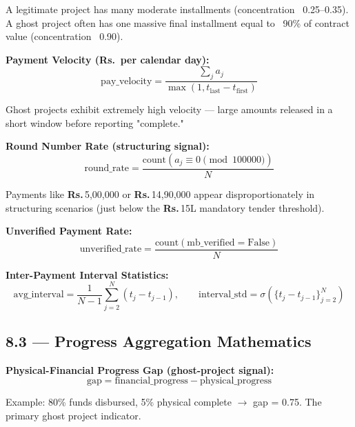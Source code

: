 \documentclass[11pt,a4paper]{article}
\DeclareRobustCommand{\INR}{\textbf{Rs.\,}}
\DeclareRobustCommand{\INR}{₹}
\begin{document}
\begin{tcolorbox}[colback=blue!4!white,colframe=blue!60!black,arc=1.5mm,boxrule=0.7pt,left=8pt,right=8pt,top=6pt,bottom=6pt]
A legitimate project has many moderate installments (concentration ~0.25–0.35). A ghost project often has one massive final installment equal to ~90\% of contract value (concentration ~0.90).\\
\end{tcolorbox}

\textbf{Payment Velocity (\INR{} per calendar day):}
\[ \text{pay\_velocity} = \frac{\sum_j a_j}{\max(1, t_\text{last} - t_\text{first})} \]

\begin{tcolorbox}[colback=blue!4!white,colframe=blue!60!black,arc=1.5mm,boxrule=0.7pt,left=8pt,right=8pt,top=6pt,bottom=6pt]
Ghost projects exhibit extremely high velocity --- large amounts released in a short window before reporting "complete."\\
\end{tcolorbox}

\textbf{Round Number Rate (structuring signal):}
\[ \text{round\_rate} = \frac{\text{count}(a_j \equiv 0 \pmod{100000})}{N} \]

\begin{tcolorbox}[colback=blue!4!white,colframe=blue!60!black,arc=1.5mm,boxrule=0.7pt,left=8pt,right=8pt,top=6pt,bottom=6pt]
Payments like \INR{}5,00,000 or \INR{}14,90,000 appear disproportionately in structuring scenarios (just below the \INR{}15L mandatory tender threshold).\\
\end{tcolorbox}

\textbf{Unverified Payment Rate:}
\[ \text{unverified\_rate} = \frac{\text{count}(\text{mb\_verified} = \text{False})}{N} \]

\textbf{Inter-Payment Interval Statistics:}
\[ \text{avg\_interval} = \frac{1}{N-1}\sum_{j=2}^{N}(t_j - t_{j-1}), \qquad \text{interval\_std} = \sigma(\{t_j - t_{j-1}\}_{j=2}^{N}) \]

\subsection{8.3 --- Progress Aggregation Mathematics}

\textbf{Physical-Financial Progress Gap (ghost-project signal):}
\[ \text{gap} = \text{financial\_progress} - \text{physical\_progress} \]

\begin{tcolorbox}[colback=blue!4!white,colframe=blue!60!black,arc=1.5mm,boxrule=0.7pt,left=8pt,right=8pt,top=6pt,bottom=6pt]
Example: 80\% funds disbursed, 5\% physical complete $\rightarrow$ gap = 0.75. The primary ghost project indicator.\\
\end{tcolorbox}
\end{document}
